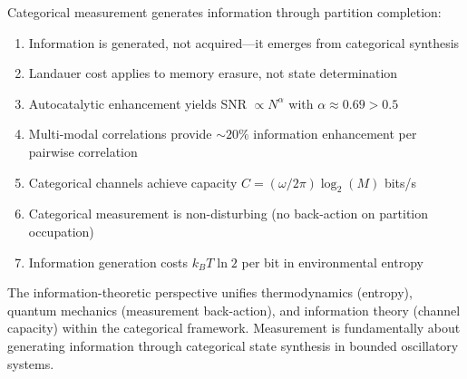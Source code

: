Categorical measurement generates information through partition completion:
\begin{enumerate}
\item Information is generated, not acquired—it emerges from categorical synthesis
\item Landauer cost applies to memory erasure, not state determination
\item Autocatalytic enhancement yields SNR $\propto N^{\alpha}$ with $\alpha \approx 0.69 > 0.5$
\item Multi-modal correlations provide $\sim 20\%$ information enhancement per pairwise correlation
\item Categorical channels achieve capacity $C = (\omega/2\pi)\log_2(M)$ bits/s
\item Categorical measurement is non-disturbing (no back-action on partition occupation)
\item Information generation costs $k_B T \ln 2$ per bit in environmental entropy
\end{enumerate}

The information-theoretic perspective unifies thermodynamics (entropy), quantum mechanics (measurement back-action), and information theory (channel capacity) within the categorical framework. Measurement is fundamentally about generating information through categorical state synthesis in bounded oscillatory systems.
